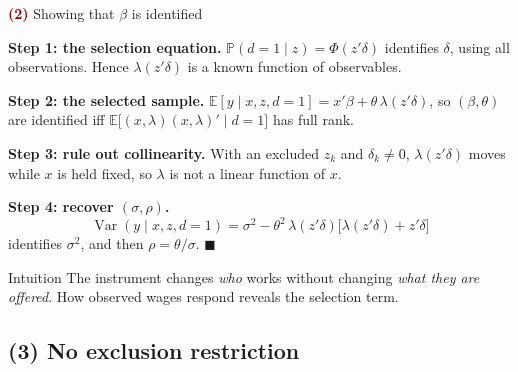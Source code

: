 \documentclass[aspectratio=169,11pt]{beamer}
\newcommand{\E}{\mathbb{E}}
\newcommand{\Pp}{\mathbb{P}}
\newcommand{\Part}[1]{\textcolor{DarkRed}{\textbf{(#1)}}}
\newcommand{\Mills}{\lambda}
\begin{document}
\begin{frame}{\Part{2} Showing that $\beta$ is identified}

\textbf{Step 1: the selection equation.}
$\Pp(d=1\mid z)=\Phi(z'\delta)$ identifies $\delta$, using all observations.
Hence $\Mills(z'\delta)$ is a known function of observables.

\pause

\textbf{Step 2: the selected sample.}
$\E[y\mid x,z,d=1]=x'\beta+\theta\,\Mills(z'\delta)$, so
$(\beta,\theta)$ are identified iff $\E\big[(x,\Mills)(x,\Mills)'\mid d=1\big]$
has full rank.

\pause

\textbf{Step 3: rule out collinearity.}
With an excluded $z_k$ and $\delta_k\neq0$, $\Mills(z'\delta)$ moves while
$x$ is held fixed, so $\Mills$ is not a linear function of $x$.

\pause

\textbf{Step 4: recover $(\sigma,\rho)$.}
\[
\operatorname{Var}(y\mid x,z,d=1)=\sigma^2-\theta^2\,\Mills(z'\delta)\big[\Mills(z'\delta)+z'\delta\big]
\]
identifies $\sigma^2$, and then $\rho=\theta/\sigma$. \hfill $\blacksquare$

\pause

\begin{block}{Intuition}
The instrument changes \emph{who} works without changing \emph{what they
are offered}. How observed wages respond reveals the selection term.
\end{block}

\end{frame}

\subsection{(3) No exclusion restriction}
\end{document}
